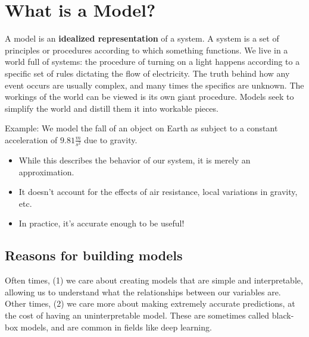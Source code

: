 \documentclass[
  letterpaper,
  DIV=11,
  numbers=noendperiod]{scrreprt}
\providecommand{\tightlist}{%
  \setlength{\itemsep}{0pt}\setlength{\parskip}{0pt}}\usepackage{longtable,booktabs,array}
\begin{document}
\hypertarget{what-is-a-model}{%
\section{What is a Model?}\label{what-is-a-model}}

A model is an \textbf{idealized representation} of a system. A system is
a set of principles or procedures according to which something
functions. We live in a world full of systems: the procedure of turning
on a light happens according to a specific set of rules dictating the
flow of electricity. The truth behind how any event occurs are usually
complex, and many times the specifics are unknown. The workings of the
world can be viewed is its own giant procedure. Models seek to simplify
the world and distill them it into workable pieces.

Example: We model the fall of an object on Earth as subject to a
constant acceleration of \(9.81 \frac{m}{s^2}\) due to gravity.

\begin{itemize}
\tightlist
\item
  While this describes the behavior of our system, it is merely an
  approximation.
\item
  It doesn't account for the effects of air resistance, local variations
  in gravity, etc.
\item
  In practice, it's accurate enough to be useful!
\end{itemize}

\hypertarget{reasons-for-building-models}{%
\subsection{Reasons for building
models}\label{reasons-for-building-models}}

Often times, (1) we care about creating models that are simple and
interpretable, allowing us to understand what the relationships between
our variables are. Other times, (2) we care more about making extremely
accurate predictions, at the cost of having an uninterpretable model.
These are sometimes called black-box models, and are common in fields
like deep learning.
\end{document}
